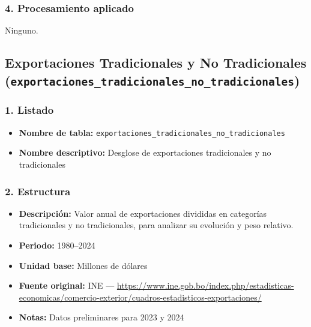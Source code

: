 \documentclass[12pt,a4paper]{article}
\begin{document}
\subsubsection*{4. Procesamiento aplicado}
Ninguno.

\newpage
\subsection{Exportaciones Tradicionales y No Tradicionales\\
\small(\texttt{exportaciones\_tradicionales\_no\_tradicionales})}



\subsubsection*{1. Listado}
\begin{itemize}
  \item \textbf{Nombre de tabla:} \texttt{exportaciones\_tradicionales\_no\_tradicionales}
  \item \textbf{Nombre descriptivo:} Desglose de exportaciones tradicionales y no tradicionales
\end{itemize}

\subsubsection*{2. Estructura}
\begin{itemize}
  \item \textbf{Descripción:} Valor anual de exportaciones divididas en categorías tradicionales y no tradicionales, para analizar su evolución y peso relativo.
  \item \textbf{Periodo:} 1980--2024
  \item \textbf{Unidad base:} Millones de dólares
  \item \textbf{Fuente original:} INE — \url{https://www.ine.gob.bo/index.php/estadisticas-economicas/comercio-exterior/cuadros-estadisticos-exportaciones/}
  \item \textbf{Notas:} Datos preliminares para 2023 y 2024
\end{itemize}
\end{document}
